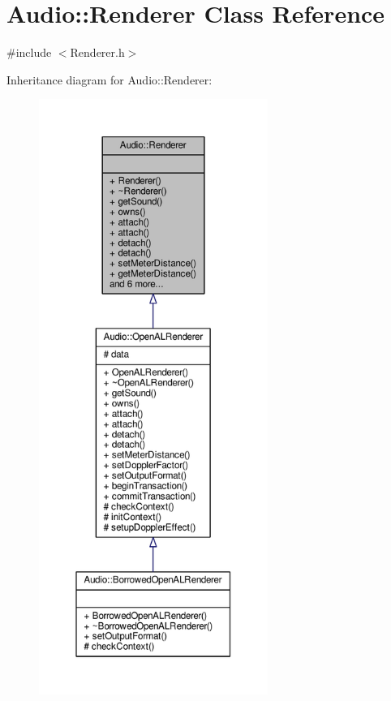 \hypertarget{classAudio_1_1Renderer}{}\section{Audio\+:\+:Renderer Class Reference}
\label{classAudio_1_1Renderer}


{\ttfamily \#include $<$Renderer.\+h$>$}



Inheritance diagram for Audio\+:\+:Renderer\+:
\nopagebreak
\begin{figure}[H]
\begin{center}
\leavevmode
\includegraphics[height=550pt]{d1/db7/classAudio_1_1Renderer__inherit__graph}
\end{center}
\end{figure}


